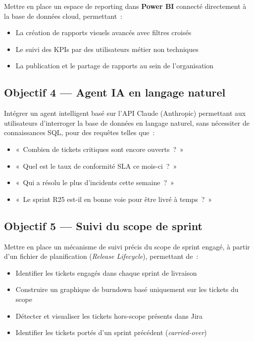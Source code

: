 \documentclass[12pt, a4paper]{report}
\begin{document}
Mettre en place un espace de reporting dans \textbf{Power BI} connecté directement à la base de données cloud, permettant~:
\begin{itemize}[leftmargin=2em]
    \item La création de rapports visuels avancés avec filtres croisés
    \item Le suivi des KPIs par des utilisateurs métier non techniques
    \item La publication et le partage de rapports au sein de l'organisation
\end{itemize}

\subsection{Objectif 4 — Agent IA en langage naturel}

Intégrer un agent intelligent basé sur l'API Claude (Anthropic) permettant aux utilisateurs d'interroger la base de données en langage naturel, sans nécessiter de connaissances SQL, pour des requêtes telles que~:
\begin{itemize}[leftmargin=2em]
    \item «~Combien de tickets critiques sont encore ouverts~?~»
    \item «~Quel est le taux de conformité SLA ce mois-ci~?~»
    \item «~Qui a résolu le plus d'incidents cette semaine~?~»
    \item «~Le sprint R25 est-il en bonne voie pour être livré à temps~?~»
\end{itemize}

\subsection{Objectif 5 — Suivi du scope de sprint}

Mettre en place un mécanisme de suivi précis du scope de sprint engagé, à partir d'un fichier de planification (\textit{Release Lifecycle}), permettant de~:
\begin{itemize}[leftmargin=2em]
    \item Identifier les tickets engagés dans chaque sprint de livraison
    \item Construire un graphique de burndown basé uniquement sur les tickets du scope
    \item Détecter et visualiser les tickets hors-scope présents dans Jira
    \item Identifier les tickets portés d'un sprint précédent (\textit{carried-over})
\end{itemize}
\end{document}
